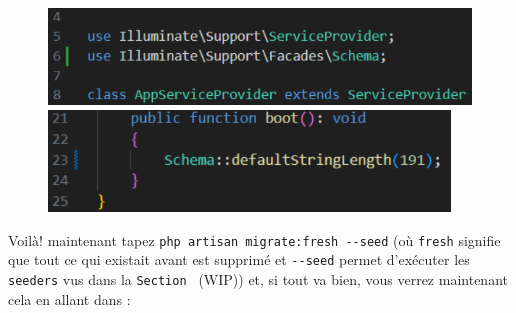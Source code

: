 \documentclass[internal]{nhitec_design}
\begin{document}
\begin{figure}[!h]
    \centering
    \begin{minipage}{0.49\textwidth}
         \centering
         \includegraphics[width=\textwidth]{figures-C1/appservice_2.pdf}
    \end{minipage}
    \begin{minipage}{0.49\textwidth}
         \centering
         \includegraphics[width=0.95\textwidth]{figures-C1/appservice_1.pdf}
    \end{minipage}
\end{figure}

Voilà! maintenant tapez \verb|php artisan migrate:fresh --seed| (où \verb|fresh| signifie que tout ce qui existait avant est supprimé et \verb|--seed| permet d'exécuter les \texttt{seeders} vus dans la \texttt{Section~} (WIP)) et, si tout va bien, vous verrez maintenant cela en allant dans \phpmyadmin{}:
\end{document}
